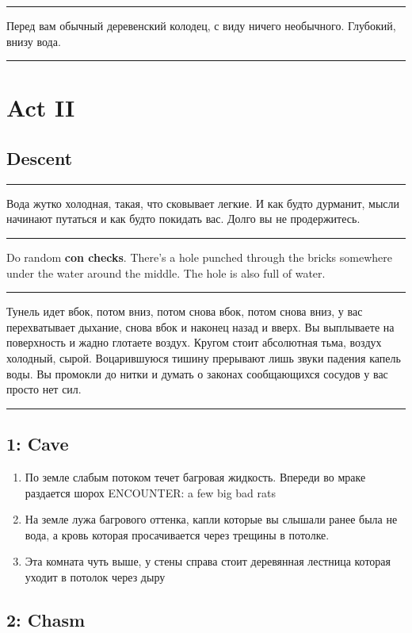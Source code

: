 \documentclass[a5paper,11pt]{book}
\newenvironment{boxed}
{\em\noindent\rule[1ex]{\linewidth}{0.1pt}\linebreak\indent}
{\par\noindent\rule[1ex]{\linewidth}{0.1pt}}
\begin{document}
\begin{multicols}{2}
\begin{boxed}
  Перед вам обычный деревенский колодец, с виду ничего необычного. Глубокий, внизу вода.
\end{boxed}

\section{Act II}

\subsection{Descent}

\begin{boxed}
Вода жутко холодная, такая, что сковывает легкие. И как будто дурманит, мысли начинают путаться и как будто покидать вас. Долго вы не продержитесь.
\end{boxed}

Do random \textbf{con checks}. There's a hole punched through the bricks somewhere under the water around the middle. The hole is also full of water.

\begin{boxed}
Тунель идет вбок, потом вниз, потом снова вбок, потом снова вниз, у вас перехватывает дыхание, снова вбок и наконец назад и вверх. Вы выплываете на поверхность и жадно глотаете воздух. Кругом стоит абсолютная тьма, воздух холодный, сырой. Воцарившуюся тишину прерывают лишь звуки падения капель воды. Вы промокли до нитки и думать о законах сообщающихся сосудов у вас просто нет сил. 
\end{boxed}

\subsection{1: Cave}

\begin{enumerate}
\item По земле слабым потоком течет багровая жидкость. Впереди во мраке раздается шорох ENCOUNTER: a few big bad rats
\item На земле лужа багрового оттенка, капли которые вы слышали ранее была не вода, а кровь которая просачивается через трещины в потолке.
\item Эта комната чуть выше, у стены справа стоит деревянная лестница которая уходит в потолок через дыру
\end{enumerate}

\subsection{2: Chasm}


\end{multicols}
\end{document}
